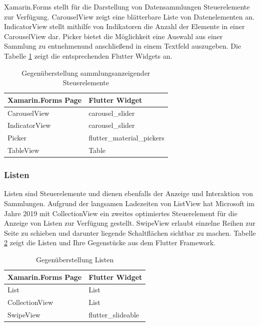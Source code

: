 Xamarin.Forms stellt für die Darstellung von Datensammlungen Steuerelemente zur Verfügung.  \glq CarouselView\grq{}  zeigt eine blätterbare Liste von Datenelementen an.   \glq IndicatorView\grq{}  stellt mithilfe von Indikatoren die Anzahl der Elemente in einer  \glq CarouselView\grq{} dar.   \glq Picker\grq{}  bietet die Möglichkeit eine Auswahl aus einer Sammlung zu entnehmenund anschließend in einem Textfeld auszugeben.   Die Tabelle \ref{tab:Collections} zeigt die entsprechenden Flutter Widgets an.


\begin{table}[!ht]
\begin{tabularx}{\textwidth}{X|X}
   \textbf{Xamarin.Forms Page} & \textbf{Flutter Widget}  \\
\hline
	CarouselView		       		&  	carousel\_slider  		\\ 
	IndicatorView		       		&  	carousel\_slider		\\ 	
	Picker		       					&  	flutter\_material\_pickers		\\ 
	TableView		       				&  	Table		\\ 
\end{tabularx}
\caption{Gegenüberstellung sammlungsanzeigender Steuerelemente}
 \label{tab:Collections}
\end{table}


\subsubsection{Listen}

Listen sind  Steuerelemente und dienen ebenfalls der Anzeige und Interaktion von Sammlungen.  Aufgrund der langsamen Ladezeiten von \glq ListView\grq{} hat Microsoft im Jahre 2019 mit  \glq CollectionView\grq{}  ein zweites optimiertes Steuerelement für die Anzeige von Listen zur Verfügung gestellt.   \glq SwipeView\grq{} erlaubt einzelne Reihen zur Seite zu schieben und darunter liegende Schaltflächen sichtbar zu machen.  Tabelle \ref{tab:Listview} zeigt die Listen und Ihre Gegenstücke aus dem Flutter Framework. 
\begin{table}[!ht]
\begin{tabularx}{\textwidth}{X|X}
   \textbf{Xamarin.Forms Page} & \textbf{Flutter Widget}  \\
\hline
	List		       				&  	List 		\\ 
	CollectionView		       				&  	List 		\\ 
	SwipeView		       		&  	flutter\_slideable 		\\ 
\end{tabularx}
\caption{Gegenüberstellung Listen}
 \label{tab:Listview}
\end{table}

